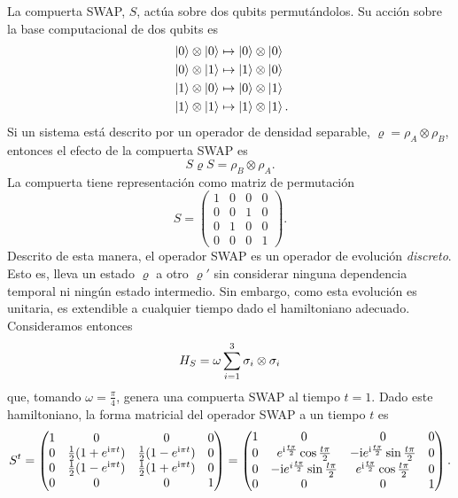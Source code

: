La compuerta SWAP, $S$, actúa sobre dos qubits permutándolos. Su acción sobre la base computacional de dos qubits es
\begin{align}
    \ket{0}\otimes\ket{0}&\mapsto\ket{0}\otimes\ket{0}\nonumber\\
    \ket{0}\otimes\ket{1}&\mapsto\ket{1}\otimes\ket{0}\nonumber\\
    \ket{1}\otimes\ket{0}&\mapsto\ket{0}\otimes\ket{1}\nonumber\\
    \ket{1}\otimes\ket{1}&\mapsto\ket{1}\otimes\ket{1} \rlap{.}\nonumber
\end{align}
Si un sistema está descrito por un operador de densidad separable, $\varrho=\rho_{A}\otimes\rho_{B}$, entonces el efecto de la compuerta SWAP es 
\begin{equation}
    S\varrho S=\rho_{B}\otimes\rho_{A}.\nonumber
\end{equation}
La compuerta tiene representación como matriz de permutación
\begin{equation}
    S=\begin{pmatrix}
        1&0&0&0\\
        0&0&1&0\\
        0&1&0&0\\
        0&0&0&1
    \end{pmatrix}.\nonumber
\end{equation}
Descrito de esta manera, el operador SWAP es un operador de evolución \textit{discreto}. Esto es, lleva un estado $\varrho$ a otro $\varrho'$ sin considerar ninguna dependencia temporal ni ningún estado intermedio. Sin embargo, como esta evolución es unitaria, es extendible a cualquier tiempo dado el hamiltoniano adecuado. Consideramos entonces
\begin{equation}
  H_{S}=\omega\sum_{i=1}^{3}\sigma_{i}\otimes\sigma_{i}\nonumber
\end{equation}
que, tomando $\omega=\frac{\pi}{4}$, genera una compuerta SWAP al tiempo $t=1$. Dado este hamiltoniano, la forma matricial del operador \textsc{SWAP} a un tiempo $t$ es
\begin{equation}\label{eq:SWAP(t)}
S^{t}=\begin{pmatrix}
 1 & 0 & 0 & 0 \\
 0 & \frac{1}{2}(1+e^{\text{i} \pi t}) & \frac{1}{2} (1-e^{\text{i} \pi t}) & 0 \\
 0 & \frac{1}{2}(1-e^{\text{i} \pi t}) & \frac{1}{2}(1+e^{\text{i} \pi t}) & 0 \\
 0 & 0 & 0 & 1
\end{pmatrix}=\begin{pmatrix}
  1 & 0 & 0 & 0 \\
  0 & e^{\text{i}\frac{t\pi}{2}}\cos{\frac{t\pi}{2}} & -\text{i} e^{\text{i}\frac{t\pi}{2}}\sin{\frac{t\pi}{2}} & 0 \\
  0 & -\text{i} e^{i\frac{t\pi}{2}}\sin{\frac{t\pi}{2}} & e^{\text{i}\frac{t\pi}{2}}\cos{\frac{t\pi}{2}}  & 0 \\
  0 & 0 & 0 & 1
 \end{pmatrix}.
\end{equation}

